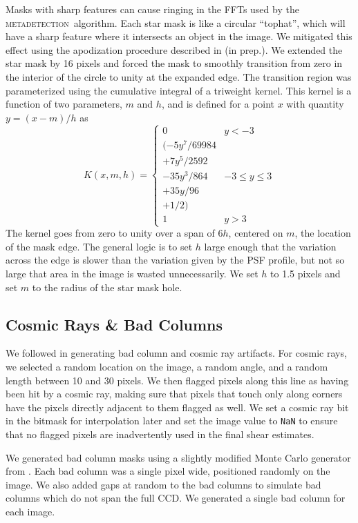 \documentclass[twocolumn,twocolappendix,astrosym]{openjournal}
\newcommand{\mdet}{\textsc{metadetection}}
\begin{document}
Masks with sharp features can cause ringing in the FFTs used by the \mdet\
algorithm.   Each star mask is like a circular ``tophat'', which will have a
sharp feature where it intersects an object in the image.  We mitigated this
effect using the apodization procedure described in \citet{BeckerMdetCoadd} (in
prep.). We extended the star mask by 16 pixels and forced the mask to smoothly
transition from zero in the interior of the circle to unity at the expanded
edge. The transition region was parameterized using the cumulative integral of
a triweight kernel. This kernel is a function of two parameters, $m$ and $h$,
and is defined for a point $x$ with quantity $y = (x-m)/h$ as
\begin{equation}
K(x, m, h) = \begin{cases}
0 & y < -3 \\
(-5y^7 / 69984 \\
+ 7y^5 / 2592 \\
- 35y^3 / 864 & -3 \le y \le 3 \\
+ 35y / 96 \\
+ 1 / 2) \\
1 & y > 3
\end{cases}
\end{equation}
The kernel goes from zero to unity over a span of $6h$, centered on $m$, the location
of the mask edge.  The
general logic is to set $h$ large enough that the variation across the edge is
slower than the variation given by the PSF profile, but not so large that area
in the image is wasted unnecessarily. We set $h$ to 1.5 pixels and set $m$ to
the radius of the star mask hole.

\subsection{Cosmic Rays \& Bad Columns} \label{sec:sim:cosmics_badcols}

We followed \citet{BeckerMdetCoadd} in generating bad column and
cosmic ray artifacts.  For cosmic rays, we selected a random location on the
image, a random angle, and a random length between 10 and 30 pixels. We then
flagged pixels along this line as having been hit by a cosmic ray, making sure
that pixels that touch only along corners have the pixels directly adjacent to
them flagged as well. We set a cosmic ray bit in the bitmask for interpolation
later and set the image value to \texttt{NaN} to ensure that no flagged pixels
are inadvertently used in the final shear estimates.

We generated bad column masks using a slightly modified Monte Carlo generator
from \citet{BeckerMdetCoadd}. Each bad column was a single pixel wide,
positioned randomly on the image. We also added gaps at random to the bad
columns to simulate bad columns which do not span the full CCD.  We generated
a single bad column for each image.
\end{document}
